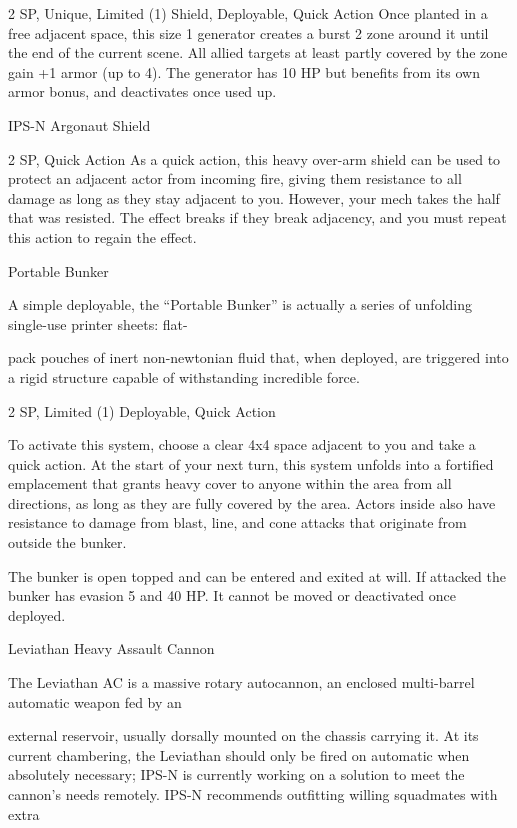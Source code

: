 2 SP, Unique, Limited (1)
Shield, Deployable, Quick Action
Once planted in a free adjacent space, this size 1 generator creates a burst 2 zone around it until
the end of the current scene. All allied targets at least partly covered by the zone gain +1 armor
(up to 4). The generator has 10 HP but benefits from its own armor bonus, and deactivates once
used up.


IPS-N Argonaut Shield

2 SP, Quick Action
As a quick action, this heavy over-arm shield can be used to protect an adjacent actor from
incoming fire, giving them resistance to all damage as long as they stay adjacent to you.
However, your mech takes the half that was resisted. The effect breaks if they break adjacency,
and you must repeat this action to regain the effect.


Portable Bunker


A simple deployable, the “Portable Bunker” is actually a series of unfolding single-use printer sheets: flat-

pack pouches of inert non-newtonian fluid that, when deployed, are triggered into a rigid structure capable
of withstanding incredible force.

2 SP, Limited (1)
Deployable, Quick Action

To activate this system, choose a clear 4x4 space adjacent to you and take a quick action. At the
start of your next turn, this system unfolds into a fortified emplacement that grants heavy cover
to anyone within the area from all directions, as long as they are fully covered by the area. Actors
inside also have resistance to damage from blast, line, and cone attacks that originate from
outside the bunker.


The bunker is open topped and can be entered and exited at will. If attacked the bunker has
evasion 5 and 40 HP. It cannot be moved or deactivated once deployed.





Leviathan Heavy Assault Cannon

The Leviathan AC is a massive rotary autocannon, an enclosed multi-barrel automatic weapon fed by an

external reservoir, usually dorsally mounted on the chassis carrying it. At its current chambering, the
Leviathan should only be fired on automatic when absolutely necessary; IPS-N is currently working on a
solution to meet the cannon’s needs remotely. IPS-N recommends outfitting willing squadmates with extra

